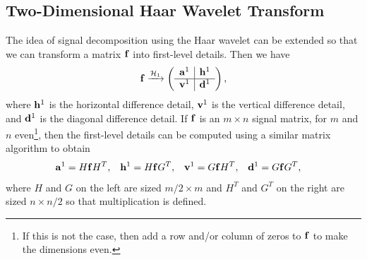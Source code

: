 \documentclass{article}
\theoremstyle{definition}
\begin{document}
  \subsection{Two-Dimensional Haar Wavelet Transform}
  The idea of signal decomposition using the Haar wavelet can be extended so that we can transform a matrix \(\vb{f}\) into first-level details. Then we have
  \begin{equation} 
    \vb{f} \xrightarrow{\mathcal{H}_1}
    \left(\begin{array}{c|c}
      \vb{a}^1 & \vb{h}^1\\ \hline
      \vb{v}^1 & \vb{d}^1
    \end{array}\right),
  \end{equation}
  where \(\vb{h}^1\) is the horizontal difference detail, \(\vb{v}^1\) is the vertical difference detail, and \(\vb{d}^1\) is the diagonal difference detail. If \(\vb{f}\) is an \(m \times n\) signal matrix, for \(m\) and \(n\) even\footnote{If this is not the case, then add a row and/or column of zeros to \(\vb{f}\) to make the dimensions even.}, then the first-level details can be computed using a similar matrix algorithm to obtain
  \begin{align} \label{eqn:matrix-decomp}
      \vb{a}^1 &= H \vb{f} H^T, &
      \vb{h}^1 &= H \vb{f} G^T, &
      \vb{v}^1 &= G \vb{f} H^T, &
      \vb{d}^1 &= G \vb{f} G^T,
  \end{align}
  where \(H\) and \(G\) on the left are sized \(m/2 \times m\) and \(H^T\) and \(G^T\) on the right are sized \(n \times n/2\) so that multiplication is defined.
  
\end{document}
